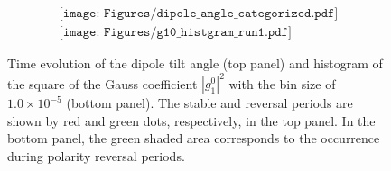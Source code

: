 \begin{figure}[ht]
\begin{center}
\[
\begin{array}{c}
\texttt{[image: Figures/dipole\_angle\_categorized.pdf]} \\
\texttt{[image: Figures/g10\_histgram\_run1.pdf]}
\end{array}
\]
\end{center}
\caption{
Time evolution of the dipole tilt angle (top panel) and histogram of the square of the Gauss coefficient $|g_{1}^{0}|^2$ with the bin size of $1.0 \times 10^{-5}$ (bottom panel).
The stable and reversal periods are shown by red and green dots, respectively, in the top panel. 
In the bottom panel, the green shaded area corresponds to the occurrence during polarity reversal periods.
}
\label{Fig:Reversal_period_def}
\end{figure}